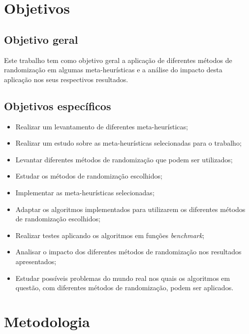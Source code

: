 \documentclass[11pt]{article}
\begin{document}
\section{Objetivos}
\label{obj}

\subsection{Objetivo geral}
\label{objgeral}

Este trabalho tem como objetivo geral a aplicação de diferentes métodos de randomização em algumas meta-heurísticas e a análise do impacto desta aplicação nos seus respectivos resultados.

\subsection{Objetivos específicos}
\label{objesp}

\begin{itemize}
    \item Realizar um levantamento de diferentes meta-heurísticas;
    \item Realizar um estudo sobre as meta-heurísticas selecionadas para o trabalho;
    \item Levantar diferentes métodos de randomização que podem ser utilizados;
    \item Estudar os métodos de randomização escolhidos;
    \item Implementar as meta-heurísticas selecionadas;
    \item Adaptar os algoritmos implementados para utilizarem os diferentes métodos de randomização escolhidos;
    \item Realizar testes aplicando os algoritmos em funções \textit{benchmark};
    \item Analisar o impacto dos diferentes métodos de randomização nos resultados apresentados;
    \item Estudar possíveis problemas do mundo real nos quais os algoritmos em questão, com diferentes métodos de randomização, podem ser aplicados.
\end{itemize}


\section{Metodologia}
\label{met}
\end{document}
